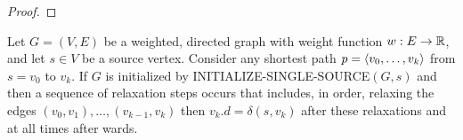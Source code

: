\documentclass[11pt]{article}
\begin{document}
\begin{proof}

\end{proof}

\begin{lemma}
Let \(G=(V,E)\) be a weighted, directed graph with weight function \(w:E\to\mathbb{R}\), and let \(s\in V\)
be a source vertex. Consider any shortest path \(p=\langle v_0,\dots,v_k\rangle\) from \(s=v_0\) to \(v_k\).
If \(G\) is initialized by INITIALIZE-SINGLE-SOURCE\((G,s)\) and then a sequence of relaxation
steps occurs that includes, in order, relaxing the edges \((v_0,v_1),\dots,(v_{k-1},v_k)\)
then \(v_k.d=\delta(s,v_k)\) after these relaxations and at all times after wards.
\end{lemma}
\end{document}
